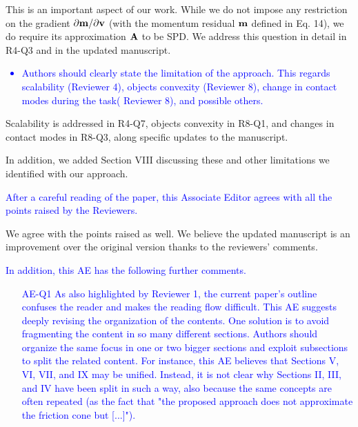This is an important aspect of our work. While we do not impose any restriction
on the gradient $\partial {\mathbf{m}}/\partial {\mathbf{v}}$ (with the momentum residual
${\mathbf{m}}$ defined in Eq. 14), we do require its approximation ${\mathbf{A}}$ to be SPD.
We address this question in detail in R4-Q3 and in the updated manuscript.


\textcolor{blue}{
\begin{itemize}
    \item Authors should clearly state the limitation of the approach. This
regards scalability (Reviewer 4), objects convexity (Reviewer 8), change in
contact modes during the task( Reviewer 8), and possible others. \end{itemize}}

Scalability is addressed in R4-Q7, objects convexity in R8-Q1, and changes in
contact modes in R8-Q3, along specific updates to the manuscript.

In addition, we added Section VIII discussing these and other limitations we
identified with our approach.

\vspace{5mm}
\textcolor{blue}{After a careful reading of the paper, this Associate Editor
agrees with all the points raised by the Reviewers.}

We agree with the points raised as well. We believe the updated manuscript is an
improvement over the original version thanks to the reviewers' comments.

\vspace{5mm}
\textcolor{blue}{In addition, this AE has the following further comments.}
\textcolor{blue}{
\begin{itemize}
    \item[AE-Q1] As also highlighted by Reviewer 1, the current paper's outline
confuses the reader and makes the reading flow difficult. This AE suggests
deeply revising the organization of the contents. One solution is to avoid
fragmenting the content in so many different sections. Authors should organize
the same focus in one or two bigger sections and exploit subsections to split
the related content. For instance, this AE believes that Sections V, VI, VII,
and IX may be unified. Instead, it is not clear why Sections II, III, and IV
have been split in such a way, also because the same concepts are often repeated
(as the fact that "the proposed approach does not approximate the friction cone
but [...]").\end{itemize}}

